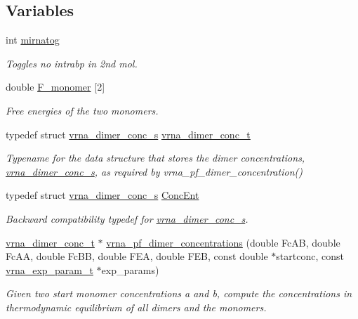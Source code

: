 \subsection*{Variables}
\begin{DoxyCompactItemize}
\item 
int \mbox{\hyperlink{group__pf__cofold_gaff27888c4088cc1f60fd59cbd589474c}{mirnatog}}
\begin{DoxyCompactList}\small\item\em Toggles no intrabp in 2nd mol. \end{DoxyCompactList}\item 
double \mbox{\hyperlink{group__pf__cofold_gac2d1851a710a8561390861155ca988fe}{F\+\_\+monomer}} \mbox{[}2\mbox{]}
\begin{DoxyCompactList}\small\item\em Free energies of the two monomers. \end{DoxyCompactList}\end{DoxyCompactItemize}
\begin{DoxyCompactItemize}
\item 
typedef struct \mbox{\hyperlink{structvrna__dimer__conc__s}{vrna\+\_\+dimer\+\_\+conc\+\_\+s}} \mbox{\hyperlink{group__pf__cofold_gac48c2723444ecfdceafcfd525ca98322}{vrna\+\_\+dimer\+\_\+conc\+\_\+t}}
\begin{DoxyCompactList}\small\item\em Typename for the data structure that stores the dimer concentrations, \mbox{\hyperlink{structvrna__dimer__conc__s}{vrna\+\_\+dimer\+\_\+conc\+\_\+s}}, as required by vrna\+\_\+pf\+\_\+dimer\+\_\+concentration() \end{DoxyCompactList}\item 
typedef struct \mbox{\hyperlink{structvrna__dimer__conc__s}{vrna\+\_\+dimer\+\_\+conc\+\_\+s}} \mbox{\hyperlink{group__pf__cofold_ga46244c7adf5040580291c45b465f4efa}{Conc\+Ent}}
\begin{DoxyCompactList}\small\item\em Backward compatibility typedef for \mbox{\hyperlink{structvrna__dimer__conc__s}{vrna\+\_\+dimer\+\_\+conc\+\_\+s}}. \end{DoxyCompactList}\item 
\mbox{\hyperlink{group__pf__cofold_gac48c2723444ecfdceafcfd525ca98322}{vrna\+\_\+dimer\+\_\+conc\+\_\+t}} $\ast$ \mbox{\hyperlink{group__pf__cofold_ga83b8d5d0f7875d6d5013b208f23e3356}{vrna\+\_\+pf\+\_\+dimer\+\_\+concentrations}} (double Fc\+AB, double Fc\+AA, double Fc\+BB, double F\+EA, double F\+EB, const double $\ast$startconc, const \mbox{\hyperlink{group__energy__parameters_ga01d8b92fe734df8d79a6169482c7d8d8}{vrna\+\_\+exp\+\_\+param\+\_\+t}} $\ast$exp\+\_\+params)
\begin{DoxyCompactList}\small\item\em Given two start monomer concentrations a and b, compute the concentrations in thermodynamic equilibrium of all dimers and the monomers. \end{DoxyCompactList}\end{DoxyCompactItemize}


